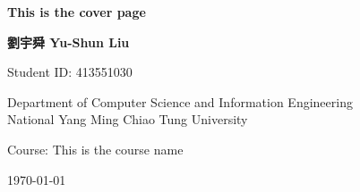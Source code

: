 \begin{titlepage}
    \begin{center}
        \vspace*{2cm}
        
        \Huge
        \textbf{This is the cover page}
        
        \vspace{1.5cm}
        
        \Large
        \textbf{劉宇舜 Yu-Shun Liu}
        
        \vspace{1cm}
        
        \large
        Student ID: 413551030
        
        \vspace{2cm}
        
        \large
        Department of Computer Science and Information Engineering\\
        National Yang Ming Chiao Tung University
        
        \vspace{1cm}
        
        \large
        Course: This is the course name
        
        \vspace{1cm}
        
        \large
        \today
        
    \end{center}
\end{titlepage} 